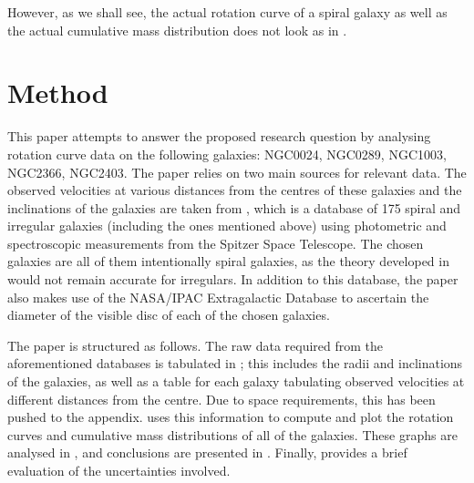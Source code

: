 \documentclass{article}
\begin{document}
However, as we shall see, the actual rotation curve of a spiral galaxy as well as the actual cumulative mass distribution does not look as in .


\section{Method}\label{sec:method}

This paper attempts to answer the proposed research question by analysing rotation curve data on the following galaxies: NGC0024, NGC0289, NGC1003, NGC2366, NGC2403.
The paper relies on two main sources for relevant data.
The observed velocities at various distances from the centres of these galaxies and the inclinations of the galaxies are taken from \Cite{SPARC}, which is a database of 175 spiral and irregular galaxies (including the ones mentioned above) using photometric and spectroscopic measurements from the Spitzer Space Telescope.
The chosen galaxies are all of them intentionally spiral galaxies, as the theory developed in  would not remain accurate for irregulars.
In addition to this database, the paper also makes use of the NASA/IPAC Extragalactic Database to ascertain the diameter of the visible disc of each of the chosen galaxies.

The paper is structured as follows.
The raw data required from the aforementioned databases is tabulated in ; this includes the radii and inclinations of the galaxies, as well as a table for each galaxy tabulating observed velocities at different distances from the centre.
Due to space requirements, this has been pushed to the appendix.
 uses this information to compute and plot the rotation curves and cumulative mass distributions of all of the galaxies.
These graphs are analysed in , and conclusions are presented in .
Finally,  provides a brief evaluation of the uncertainties involved.
\end{document}
